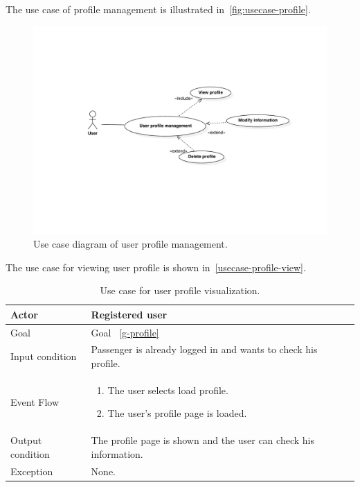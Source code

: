 The use case of profile management is illustrated in~\autoref{fig:usecase-profile}.
\begin{figure}
\includegraphics[width=\textwidth]{diagrams/usecase_profile.pdf}
\caption{Use case diagram of user profile management.}
\label{fig:usecase-profile}
\end{figure}

The use case for viewing user profile is shown in~\autoref{usecase-profile-view}.

\begin{table}
\begin{center}
\begin{tabular}{| l | p{} |}
\hline
Actor & Registered user \\
\hline
Goal & Goal ~\ref{g-profile}
\\
\hline
Input condition & Passenger is already logged in and wants to check his profile.  \\
\hline
Event Flow & \begin{enumerate}
	\item The user selects load profile.
	\item The user's profile page is loaded.
	\end{enumerate}
\\
\hline
Output condition & The profile page is shown and the user can check his information. \\
\hline

Exception & None. \\
\hline
\end{tabular}
\end{center}
\caption{Use case for user profile visualization.}
\label{usecase-profile-view}
\end{table}



